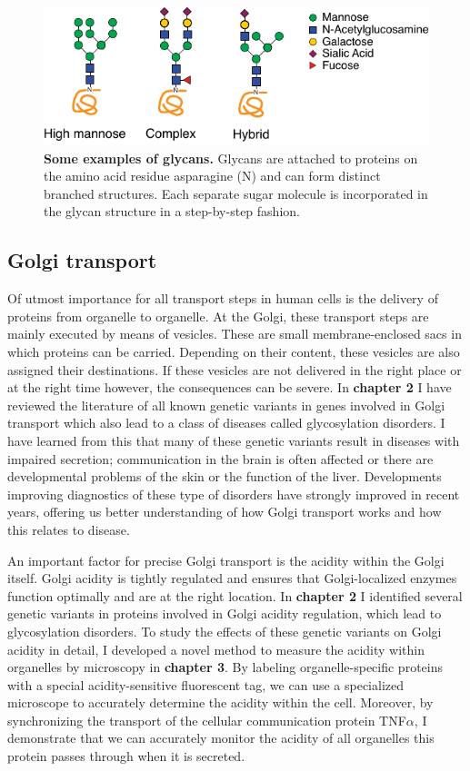 \begin{figure}
    \includegraphics[keepaspectratio=true,width=\textwidth,height=\textheight]{chapters/chapter8/chapter8_Figure1_en.pdf}
    \caption{\textbf{Some examples of glycans.} Glycans are attached to proteins on the amino acid residue asparagine (N) and can form distinct branched structures. Each separate sugar molecule is incorporated in the glycan structure in a step-by-step fashion.}
    \label{fig:ch8fig1en}
\end{figure}

\subsection{Golgi transport}
Of utmost importance for all transport steps in human cells is the delivery of proteins from organelle to organelle. At the Golgi, these transport steps are mainly executed by means of vesicles. These are small membrane-enclosed sacs in which proteins can be carried. Depending on their content, these vesicles are also assigned their destinations. If these vesicles are not delivered in the right place or at the right time however, the consequences can be severe. In \textbf{chapter 2} I have reviewed the literature of all known genetic variants in genes involved in Golgi transport which also lead to a class of diseases called glycosylation disorders. I have learned from this that many of these genetic variants result in diseases with impaired secretion; communication in the brain is often affected or there are developmental problems of the skin or the function of the liver. Developments improving diagnostics of these type of disorders have strongly improved in recent years, offering us better understanding of how Golgi transport works and how this relates to disease.

An important factor for precise Golgi transport is the acidity within the Golgi itself. Golgi acidity is tightly regulated and ensures that Golgi-localized enzymes function optimally and are at the right location. In \textbf{chapter 2} I identified several genetic variants in proteins involved in Golgi acidity regulation, which lead to glycosylation disorders. To study the effects of these genetic variants on Golgi acidity in detail, I developed a novel method to measure the acidity within organelles by microscopy in \textbf{chapter 3}. By labeling organelle-specific proteins with a special acidity-sensitive fluorescent tag, we can use a specialized microscope to accurately determine the acidity within the cell. Moreover, by synchronizing the transport of the cellular communication protein TNF$\alpha$, I demonstrate that we can accurately monitor the acidity of all organelles this protein passes through when it is secreted.

